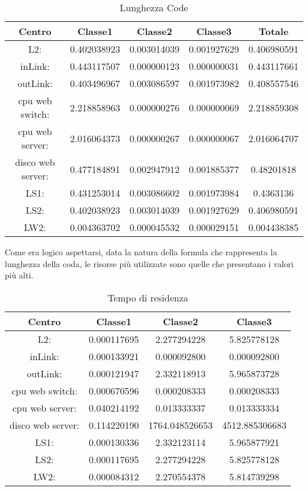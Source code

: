 \begin{table}[H]
\begin{center}
\begin{tabular}{||c|c|c|c|c||}
\hline
Centro &Classe1 &Classe2 &Classe3 &Totale\\
\hline
\hline
L2: &0.402038923 &0.003014039 &0.001927629 &0.406980591\\
\hline
inLink: &0.443117507 &0.000000123 &0.000000031 &0.443117661\\
\hline
outLink: &0.403496967 &0.003086597 &0.001973982 &0.408557546\\
\hline
cpu web switch: &2.218858963 &0.000000276 &0.000000069 &2.218859308\\
\hline
cpu web server: &2.016064373  &0.000000267 &0.000000067 &2.016064707\\
\hline
disco web server: &0.477184891 &0.002947912 &0.001885377 &0.48201818\\
\hline
LS1: &0.431253014 &0.003086602 &0.001973984 &0.4363136\\
\hline
LS2: &0.402038923 &0.003014039 &0.001927629 &0.406980591\\
\hline
LW2: &0.004363702 &0.000045532 &0.000029151 &0.004438385\\
\hline
\end{tabular}
\end{center}
\caption{Lunghezza Code}
\label{lunghezzacode}
\end{table}
Come era logico aspettarsi, data la natura della formula che rappresenta la lunghezza della coda, le risorse più utilizzate sono quelle che presentano i valori più alti.
\begin{table}[H]
\begin{center}
\begin{tabular}{||c|c|c|c||}
\hline
Centro &Classe1 &Classe2 &Classe3\\
\hline
\hline
L2: &0.000117695 &2.277294228 &5.825778128\\
\hline
inLink: &0.000133921 &0.000092800 &0.000092800\\
\hline
outLink: &0.000121947 &2.332118913 &5.965873728\\
\hline
cpu web switch: &0.000670596 &0.000208333 &0.000208333\\
\hline
cpu web server: &0.040214192 &0.013333337 &0.013333334\\
\hline
disco web server: &0.114220190 &1764.048526653 &4512.885306683\\
\hline
LS1: &0.000130336 &2.332123114 &5.965877921\\
\hline
LS2: &0.000117695 &2.277294228 &5.825778128\\
\hline
LW2: &0.000084312 &2.270554378 &5.814739298\\
\hline
\end{tabular}
\end{center}
\caption{Tempo di residenza}
\label{tempodiresidenza}
\end{table}
